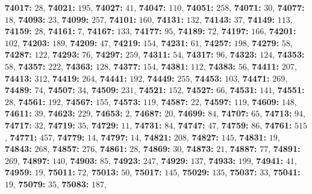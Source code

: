 \textsf{\bfseries 74017:} $28$, \textsf{\bfseries 74021:} $195$, \textsf{\bfseries 74027:} $41$, \textsf{\bfseries 74047:} $110$, \textsf{\bfseries 74051:} $258$, \textsf{\bfseries 74071:} $30$, \textsf{\bfseries 74077:} $18$, \textsf{\bfseries 74093:} $23$, \textsf{\bfseries 74099:} $257$, \textsf{\bfseries 74101:} $160$, \textsf{\bfseries 74131:} $132$, \textsf{\bfseries 74143:} $37$, \textsf{\bfseries 74149:} $113$, \textsf{\bfseries 74159:} $28$, \textsf{\bfseries 74161:} $7$, \textsf{\bfseries 74167:} $133$, \textsf{\bfseries 74177:} $95$, \textsf{\bfseries 74189:} $72$, \textsf{\bfseries 74197:} $166$, \textsf{\bfseries 74201:} $102$, \textsf{\bfseries 74203:} $189$, \textsf{\bfseries 74209:} $47$, \textsf{\bfseries 74219:} $154$, \textsf{\bfseries 74231:} $61$, \textsf{\bfseries 74257:} $198$, \textsf{\bfseries 74279:} $58$, \textsf{\bfseries 74287:} $122$, \textsf{\bfseries 74293:} $76$, \textsf{\bfseries 74297:} $259$, \textsf{\bfseries 74311:} $54$, \textsf{\bfseries 74317:} $96$, \textsf{\bfseries 74323:} $124$, \textsf{\bfseries 74353:} $58$, \textsf{\bfseries 74357:} $222$, \textsf{\bfseries 74363:} $128$, \textsf{\bfseries 74377:} $154$, \textsf{\bfseries 74381:} $112$, \textsf{\bfseries 74383:} $56$, \textsf{\bfseries 74411:} $207$, \textsf{\bfseries 74413:} $312$, \textsf{\bfseries 74419:} $264$, \textsf{\bfseries 74441:} $192$, \textsf{\bfseries 74449:} $255$, \textsf{\bfseries 74453:} $103$, \textsf{\bfseries 74471:} $269$, \textsf{\bfseries 74489:} $74$, \textsf{\bfseries 74507:} $34$, \textsf{\bfseries 74509:} $231$, \textsf{\bfseries 74521:} $152$, \textsf{\bfseries 74527:} $66$, \textsf{\bfseries 74531:} $141$, \textsf{\bfseries 74551:} $28$, \textsf{\bfseries 74561:} $192$, \textsf{\bfseries 74567:} $155$, \textsf{\bfseries 74573:} $119$, \textsf{\bfseries 74587:} $22$, \textsf{\bfseries 74597:} $119$, \textsf{\bfseries 74609:} $148$, \textsf{\bfseries 74611:} $39$, \textsf{\bfseries 74623:} $229$, \textsf{\bfseries 74653:} $2$, \textsf{\bfseries 74687:} $20$, \textsf{\bfseries 74699:} $84$, \textsf{\bfseries 74707:} $65$, \textsf{\bfseries 74713:} $94$, \textsf{\bfseries 74717:} $32$, \textsf{\bfseries 74719:} $35$, \textsf{\bfseries 74729:} $11$, \textsf{\bfseries 74731:} $84$, \textsf{\bfseries 74747:} $47$, \textsf{\bfseries 74759:} $86$, \textsf{\bfseries 74761:} $515$, \textsf{\bfseries 74771:} $457$, \textsf{\bfseries 74779:} $14$, \textsf{\bfseries 74797:} $14$, \textsf{\bfseries 74821:} $208$, \textsf{\bfseries 74827:} $145$, \textsf{\bfseries 74831:} $19$, \textsf{\bfseries 74843:} $268$, \textsf{\bfseries 74857:} $276$, \textsf{\bfseries 74861:} $28$, \textsf{\bfseries 74869:} $30$, \textsf{\bfseries 74873:} $21$, \textsf{\bfseries 74887:} $77$, \textsf{\bfseries 74891:} $269$, \textsf{\bfseries 74897:} $140$, \textsf{\bfseries 74903:} $85$, \textsf{\bfseries 74923:} $247$, \textsf{\bfseries 74929:} $137$, \textsf{\bfseries 74933:} $199$, \textsf{\bfseries 74941:} $41$, \textsf{\bfseries 74959:} $19$, \textsf{\bfseries 75011:} $72$, \textsf{\bfseries 75013:} $50$, \textsf{\bfseries 75017:} $145$, \textsf{\bfseries 75029:} $135$, \textsf{\bfseries 75037:} $33$, \textsf{\bfseries 75041:} $19$, \textsf{\bfseries 75079:} $35$, \textsf{\bfseries 75083:} $187$, 
